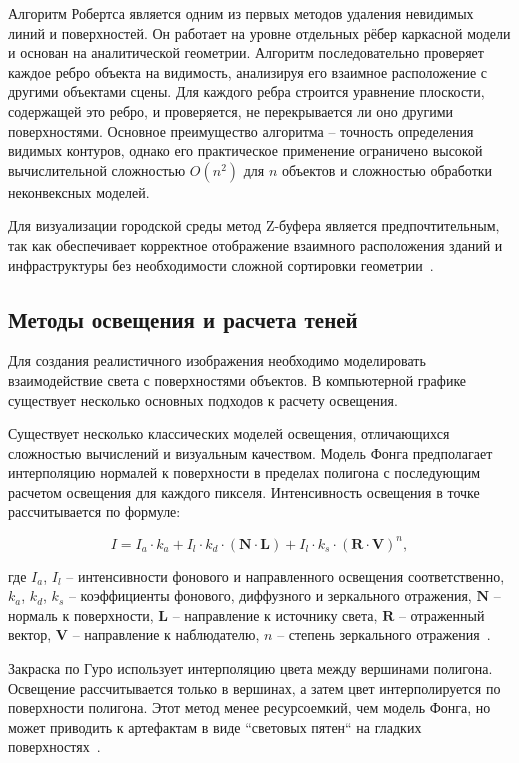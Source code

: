 Алгоритм Робертса является одним из первых методов удаления невидимых линий и поверхностей. Он работает на уровне отдельных рёбер каркасной модели и основан на аналитической геометрии. Алгоритм последовательно проверяет каждое ребро объекта на видимость, анализируя его взаимное расположение с другими объектами сцены. Для каждого ребра строится уравнение плоскости, содержащей это ребро, и проверяется, не перекрывается ли оно другими поверхностями. Основное преимущество алгоритма -- точность определения видимых контуров, однако его практическое применение ограничено высокой вычислительной сложностью $O(n^2)$ для $n$ объектов и сложностью обработки неконвексных моделей.

Для визуализации городской среды метод Z-буфера является предпочтительным, так как обеспечивает корректное отображение взаимного расположения зданий и инфраструктуры без необходимости сложной сортировки геометрии~\cite{rogers_computer_graphics}.
\subsection{Методы освещения и расчета теней}
Для создания реалистичного изображения необходимо моделировать взаимодействие света с поверхностями объектов. В компьютерной графике существует несколько основных подходов к расчету освещения.

Существует несколько классических моделей освещения, отличающихся сложностью вычислений и визуальным качеством. Модель Фонга предполагает интерполяцию нормалей к поверхности в пределах полигона с последующим расчетом освещения для каждого пикселя. Интенсивность освещения в точке рассчитывается по формуле:

\begin{equation}
I = I_a \cdot k_a + I_l \cdot k_d \cdot (\mathbf{N} \cdot \mathbf{L}) + I_l \cdot k_s \cdot (\mathbf{R} \cdot \mathbf{V})^n,
\end{equation}

где $I_a$, $I_l$ -- интенсивности фонового и направленного освещения соответственно, $k_a$, $k_d$, $k_s$ -- коэффициенты фонового, диффузного и зеркального отражения, $\mathbf{N}$ -- нормаль к поверхности, $\mathbf{L}$ -- направление к источнику света, $\mathbf{R}$ -- отраженный вектор, $\mathbf{V}$ -- направление к наблюдателю, $n$ -- степень зеркального отражения~\cite{phong_model}.

Закраска по Гуро использует интерполяцию цвета между вершинами полигона. Освещение рассчитывается только в вершинах, а затем цвет интерполируется по поверхности полигона. Этот метод менее ресурсоемкий, чем модель Фонга, но может приводить к артефактам в виде ``световых пятен`` на гладких поверхностях~\cite{gouraud_shading}.

